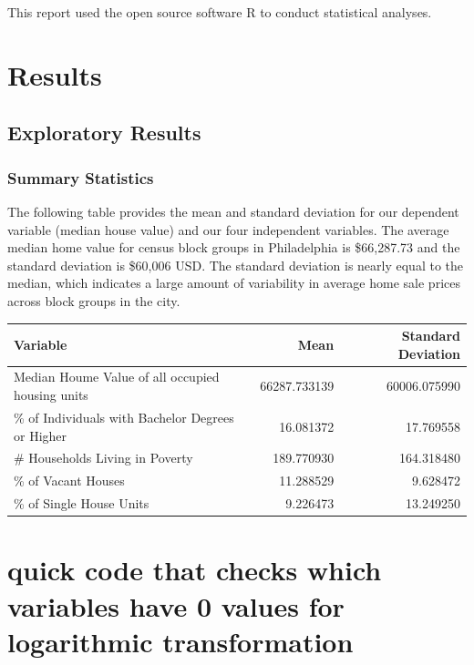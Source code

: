 \documentclass[
]{article}
\begin{document}
This report used the open source software R to conduct statistical
analyses.

\hypertarget{results}{%
\section{Results}\label{results}}

\hypertarget{exploratory-results}{%
\subsection{Exploratory Results}\label{exploratory-results}}

\hypertarget{summary-statistics}{%
\subsubsection{Summary Statistics}\label{summary-statistics}}

The following table provides the mean and standard deviation for our
dependent variable (median house value) and our four independent
variables. The average median home value for census block groups in
Philadelphia is \$66,287.73 and the standard deviation is \$60,006 USD.
The standard deviation is nearly equal to the median, which indicates a
large amount of variability in average home sale prices across block
groups in the city.

\begin{table}
\centering
\begin{tabular}[t]{l|r|r}
\hline
Variable & Mean & Standard Deviation\\
\hline
Median Houme Value of all occupied housing units & 66287.733139 & 60006.075990\\
\hline
\% of Individuals with Bachelor Degrees or Higher & 16.081372 & 17.769558\\
\hline
\# Households Living in Poverty & 189.770930 & 164.318480\\
\hline
\% of Vacant Houses & 11.288529 & 9.628472\\
\hline
\% of Single House Units & 9.226473 & 13.249250\\
\hline
\end{tabular}
\end{table}

\hypertarget{quick-code-that-checks-which-variables-have-0-values-for-logarithmic-transformation}{%
\section{quick code that checks which variables have 0 values for
logarithmic
transformation}\label{quick-code-that-checks-which-variables-have-0-values-for-logarithmic-transformation}}
\end{document}
